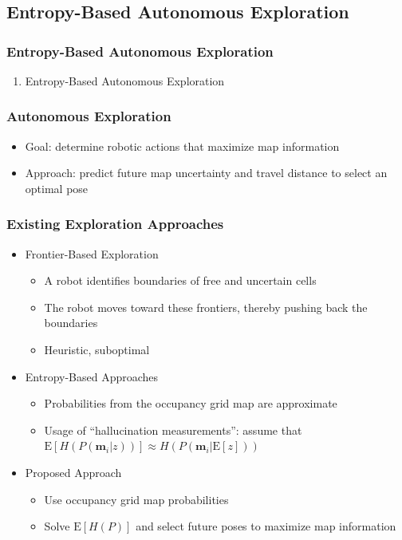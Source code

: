 \documentclass[11pt,professionalfonts,hyperref={pdftex,pdfpagemode=none,pdfstartview=FitH}]{beamer}
\begin{document}
\section*{}
\subsection*{Entropy-Based Autonomous Exploration}

\begin{frame}
\frametitle{Entropy-Based Autonomous Exploration}
\begin{enumerate}[I]
\addtocounter{enumi}{1}
	\item Entropy-Based Autonomous Exploration
\end{enumerate}
\end{frame}

\begin{frame}
\frametitle{Autonomous Exploration}

\begin{itemize}
	\item Goal: determine robotic actions that maximize map information
	\item Approach: predict future map uncertainty and travel distance to select an optimal pose
\end{itemize}

\end{frame}




\begin{frame}
\frametitle{Existing Exploration Approaches}

\begin{itemize}
	\item Frontier-Based Exploration
	\begin{itemize}
		\item A robot identifies boundaries of free and uncertain cells
		\item The robot moves toward these frontiers, thereby pushing back the boundaries
		\item Heuristic, suboptimal
	\end{itemize}
	\vspace*{0.0cm}\pause
	\item Entropy-Based Approaches
	\begin{itemize}
		\item Probabilities from the occupancy grid map are approximate
		\item Usage of ``hallucination measurements'': assume that $\text{E}[H(P(\mathbf{m}_i|z))]\approx H(P(\mathbf{m}_i|\text{E}[z]))$
	\end{itemize}
	\vspace*{0.0cm}\pause
	\item Proposed Approach
	\begin{itemize}
		\item Use occupancy grid map probabilities
		\item Solve $\text{E}[H(P)]$ and select future poses to maximize map information
	\end{itemize}
\end{itemize}
\end{frame}
\end{document}
